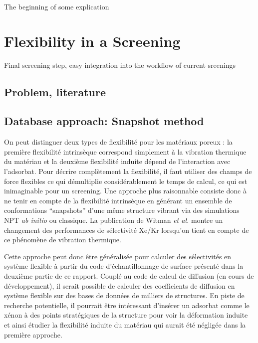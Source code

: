 \documentclass[main]{subfiles}
\begin{document}

The beginning of some explication

\section{Flexibility in a Screening}
Final screening step, easy integration into the workflow of current sreenings
\subsection{Problem, literature}

\subsection{}


\subsection{Database approach: Snapshot method}

On peut distinguer deux types de flexibilité pour les matériaux poreux : la première flexibilité intrinsèque correspond simplement à la vibration thermique du matériau et la deuxième flexibilité induite dépend de l'interaction avec l'adsorbat. Pour décrire complètement la flexibilité, il faut utiliser des champs de force flexibles ce qui démultiplie considérablement le temps de calcul, ce qui est inimaginable pour un screening. Une approche plus raisonnable consiste donc à ne tenir en compte de la flexibilité intrinsèque en générant un ensemble de conformations ``snapshots'' d'une même structure vibrant via des simulations NPT \emph{ab initio} ou classique. La publication de Witman \emph{et al.} montre un changement des performances de sélectivité Xe/Kr lorsqu'on tient en compte de ce phénomène de vibration thermique.\autocite{Witman_2017} 

Cette approche peut donc être généralisée pour calculer des sélectivités en système flexible à partir du code d'échantillonnage de surface présenté dans la deuxième partie de ce rapport. Couplé au code de calcul de diffusion (en cours de développement), il serait possible de calculer des coefficients de diffusion en système flexible sur des bases de données de milliers de structures. En piste de recherche potentielle, il pourrait être intéressant d'insérer un adsorbat comme le xénon à des points stratégiques de la structure pour voir la déformation induite et ainsi étudier la flexibilité induite du matériau qui aurait été négligée dans la première approche. 
\end{document}

